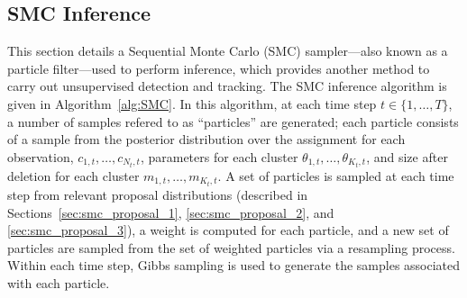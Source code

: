 \documentclass[twocolumn, final]{svjour3}
\begin{document}






\subsection{SMC Inference}
\label{sec:SMC}

This section details a Sequential Monte Carlo (SMC) sampler---also known as a particle filter---used to perform inference, which provides another method to carry out unsupervised detection and tracking. The SMC inference algorithm is given in Algorithm~\ref{alg:SMC}. In this algorithm, at each time step $t \in \{ 1, \ldots, T \}$, a number of samples refered to as ``particles'' are generated; each particle consists of a sample from the posterior distribution over the assignment for each observation, $c_{1,t}, \ldots, c_{N_{t}, t}$, parameters for each cluster $\theta_{1,t}, \ldots, \theta_{K_{t}, t}$, and size after deletion for each cluster $m_{1,t}, \ldots, m_{K_{t},t}$. A set of particles is sampled at each time step from relevant proposal distributions (described in Sections~\ref{sec:smc_proposal_1}, \ref{sec:smc_proposal_2}, and \ref{sec:smc_proposal_3}), a weight is computed for each particle, and a new set of particles are sampled from the set of weighted particles via a resampling process. Within each time step, Gibbs sampling is used to generate the samples associated with each particle.
\end{document}
